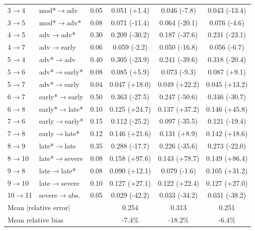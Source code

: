 \documentclass[11pt,a4paper]{article}
\begin{document}
\begin{longtable}{llcccc}
3$\to$4 & mod*$\to$adv & 0.05 & 0.051 (+1.4) & 0.046 (-7.8) & 0.043 (-13.4) \\
3$\to$5 & mod*$\to$adv* & 0.08 & 0.071 (-11.4) & 0.064 (-20.1) & 0.076 (-4.6) \\
4$\to$5 & adv$\to$adv* & 0.30 & 0.209 (-30.2) & 0.187 (-37.6) & 0.231 (-23.1) \\
4$\to$7 & adv$\to$early & 0.06 & 0.059 (-2.2) & 0.050 (-16.8) & 0.056 (-6.7) \\
5$\to$4 & adv*$\to$adv & 0.40 & 0.305 (-23.9) & 0.241 (-39.6) & 0.318 (-20.4) \\
5$\to$6 & adv*$\to$early* & 0.08 & 0.085 (+5.9) & 0.073 (-9.3) & 0.087 (+9.1) \\
5$\to$7 & adv*$\to$early & 0.04 & 0.047 (+18.0) & 0.049 (+22.2) & 0.045 (+13.2) \\
6$\to$7 & early*$\to$early & 0.50 & 0.363 (-27.5) & 0.247 (-50.6) & 0.346 (-30.7) \\
6$\to$8 & early*$\to$late* & 0.10 & 0.125 (+24.7) & 0.137 (+37.2) & 0.146 (+45.8) \\
7$\to$6 & early$\to$early* & 0.15 & 0.112 (-25.2) & 0.097 (-35.5) & 0.121 (-19.4) \\
7$\to$8 & early$\to$late* & 0.12 & 0.146 (+21.6) & 0.131 (+8.9) & 0.142 (+18.6) \\
8$\to$9 & late*$\to$late & 0.35 & 0.288 (-17.7) & 0.226 (-35.6) & 0.273 (-22.0) \\
8$\to$10 & late*$\to$severe & 0.08 & 0.158 (+97.6) & 0.143 (+78.7) & 0.149 (+86.4) \\
9$\to$8 & late$\to$late* & 0.08 & 0.090 (+12.1) & 0.079 (-1.6) & 0.105 (+31.2) \\
9$\to$10 & late$\to$severe & 0.10 & 0.127 (+27.1) & 0.122 (+22.4) & 0.127 (+27.0) \\
10$\to$11 & severe$\to$abs. & 0.05 & 0.029 (-42.2) & 0.033 (-34.2) & 0.031 (-38.2) \\
\midrule
\multicolumn{3}{l}{Mean $|$relative error$|$} & 0.254 & 0.313 & 0.251 \\
\multicolumn{3}{l}{Mean relative bias} & -7.4\% & -18.2\% & -6.4\% \\
\bottomrule
\end{longtable}
\end{document}
